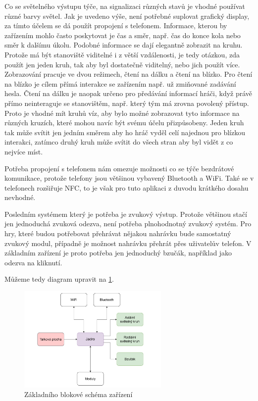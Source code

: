 \newpage

Co se světelného výstupu týče, na signalizaci různých stavů je vhodné používat různé barvy světel.
Jak je uvedeno výše, není potřebné suplovat grafický display, za tímto účelem se dá použít propojení s telefonem.
Informace, kterou by zařízením mohlo často poskytovat je čas a směr, např. čas do konce kola nebo směr k dalšímu úkolu.
Podobné informace se dají elegantně zobrazit na kruhu.
Protože má být stanoviště viditelné i z větší vzdálenosti, je tedy otázkou, zda použít jen jeden kruh, tak aby byl dostatečně viditelný, nebo jich použít více. %
Zobrazování pracuje ve dvou režimech, čtení na dálku a čtení na blízko.
Pro čtení na blízko je cílem přímá interakce se zařízením např. už zmiňované zadávání hesla.
Čtení na dálku je naopak určeno pro předávání informací hráči, když právě přímo neinteraguje se stanovištěm, např. který tým má zrovna povolený přístup.
Proto je vhodné mít kruhů víz, aby bylo možné zobrazovat tyto informace na různých kruzích, které mohou navíc být svému účelu přizpůsobeny.
Jeden kruh tak může svítit jen jedním směrem aby ho hráč vyděl celí najednou pro blízkou interakci, zatímco druhý kruh může svítit do všech stran aby byl vidět z co nejvíce míst.

Potřeba propojení s telefonem nám omezuje možnosti co se týče bezdrátové komunikace, protože telefony jsou většinou vybavený Bluetooth a WiFi.
Také se v telefonech rozšiřuje NFC, to je však pro tuto aplikaci z duvodu krátkého dosahu nevhodné.

Posledním systémem který je potřeba je zvukový výstup.
Protože většinou stačí jen jednoduchá zvuková odezva, není potřeba plnohodnotný zvukový systém.
Pro hry, které budou potřebovat přehrávat nějakou nahrávku bude samostatný zvukový modul, případně je možnost nahrávku přehrát přes uživatelův telefon.
V základním zařízení je proto potřeba jen jednoduchý bzučák, například jako odezva na kliknutí.

Můžeme tedy diagram upravit na \ref{fig:diagram_zanoreni_1}.
\begin{figure}[h]
    \centering
    \includegraphics[width=0.65\textwidth]{text/TeoretickyUvod/AplikaceHernichZarizeni/diagram/zanoreni_1.pdf}
    \caption{Základního blokové schéma zařízení}
    \label{fig:diagram_zanoreni_1}
\end{figure}

